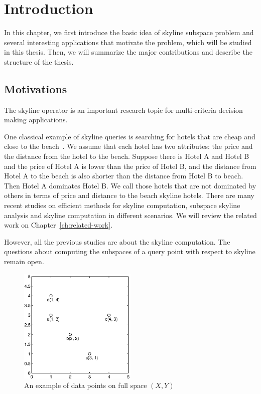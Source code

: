 
%
%

\chapter{Introduction}

In this chapter, we first introduce the basic idea of skyline subspace problem and several interesting applications that motivate the problem, which will be studied in this thesis. Then, we will summarize the major contributions and describe the structure of the thesis.

\section{Motivations}
The skyline operator is an important research topic for multi-criteria decision making applications.

One classical example of skyline queries is searching for hotels that are cheap and close to the beach~\cite{borzsony2001skyline}. We assume that each hotel has two attributes: the price and the distance from the hotel to the beach.
Suppose there is Hotel A and Hotel B and the price of Hotel A is lower than the price of Hotel B, and the distance from Hotel A to the beach is also shorter than the distance from Hotel B to beach.
Then Hotel A dominates Hotel B.
We call those hotels that are not dominated by others in terms of price and distance to the beach skyline hotels. 
There are many recent studies on efficient methods for skyline computation, subspace skyline analysis and skyline computation in different scenarios. We will review the related work on Chapter~\ref{ch:related-work}.

However, all the previous studies are about the skyline computation. The questions about computing the subspaces of a query point with respect to skyline remain open.

\begin{figure}[H]
\centering
\includegraphics[width=0.5\textwidth]{figs/intro_xy.eps}
\caption{An example of data points on full space $(X, Y)$}
\label{fig:intro_xy}
\end{figure}

